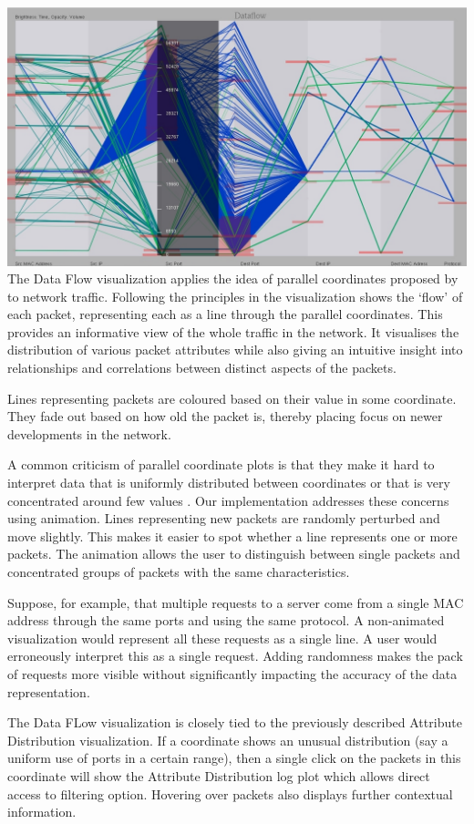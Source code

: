 \includegraphics[width=\linewidth]{materials/dataflow.jpg}
The Data Flow visualization applies the idea of parallel coordinates proposed by \cite{inselberg1985plane} to network traffic. Following the principles in \cite{fliggnetwork} the visualization shows the `flow' of each packet, representing each as a line through the parallel coordinates. This provides an informative view of the whole traffic in the network. It visualises the distribution of various packet attributes while also giving an intuitive insight into relationships and correlations between distinct aspects of the packets.

Lines representing packets are coloured based on their value in some coordinate. They fade out based on how old the packet is, thereby placing focus on newer developments in the network. 

A common criticism of parallel coordinate plots is that they make it hard to interpret data that is uniformly distributed between coordinates or that is very concentrated around few values \cite{marty2009applied}. Our implementation addresses these concerns using animation. Lines representing new packets are randomly perturbed and move slightly. This makes it easier to spot whether a line represents one or more packets. The animation allows the user to distinguish between single packets and concentrated groups of packets with the same characteristics.

Suppose, for example, that multiple requests to a server come from a single MAC address through the same ports and using the same protocol. A non-animated visualization would represent all these requests as a single line. A user would erroneously interpret this as a single request. Adding randomness makes the pack of requests more visible without significantly impacting the accuracy of the data representation.

The Data FLow visualization is closely tied to the previously described Attribute Distribution visualization. If a coordinate shows an unusual distribution (say a uniform use of ports in a certain range), then a single click on the packets in this coordinate will show the Attribute Distribution log plot which allows direct access to filtering option. Hovering over packets also displays further contextual information.